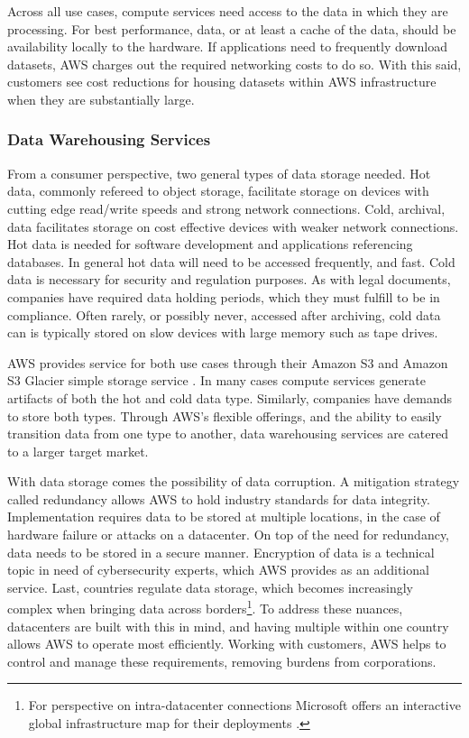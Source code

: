 \documentclass[a4paper, 12pt]{article}
\begin{document}
Across all use cases, compute services need access to the data in which they are processing.
For best performance, data, or at least a cache of the data, should be availability locally to the hardware.
If applications need to frequently download datasets, AWS charges out the required networking costs to do so.
With this said, customers see cost reductions for housing datasets within AWS infrastructure when they are substantially large.

\subsubsection{Data Warehousing Services}
From a consumer perspective, two general types of data storage needed.
Hot data, commonly refereed to object storage, facilitate storage on devices with cutting edge read/write speeds and strong network connections.
Cold, archival, data facilitates storage on cost effective devices with weaker network connections.
Hot data is needed for software development and applications referencing databases.
In general hot data will need to be accessed frequently, and fast.
Cold data is necessary for security and regulation purposes.
As with legal documents, companies have required data holding periods, which they must fulfill to be in compliance.
Often rarely, or possibly never, accessed after archiving, cold data can is typically stored on slow devices with large memory such as tape drives.

AWS provides service for both use cases through their Amazon S3 and Amazon S3 Glacier simple storage service \cite{AMZN_AWS_SIMPLE_STORAGE}.
In many cases compute services generate artifacts of both the hot and cold data type.
Similarly, companies have demands to store both types.
Through AWS's flexible offerings, and the ability to easily transition data from one type to another, data warehousing services are catered to a larger target market.

With data storage comes the possibility of data corruption.
A mitigation strategy called redundancy allows AWS to hold industry standards for data integrity.
Implementation requires data to be stored at multiple locations, in the case of hardware failure or attacks on a datacenter.
On top of the need for redundancy, data needs to be stored in a secure manner.
Encryption of data is a technical topic in need of cybersecurity experts, which AWS provides as an additional service.
Last, countries regulate data storage, which becomes increasingly complex when bringing data across borders\footnote{For perspective on intra-datacenter connections Microsoft offers an interactive global infrastructure map for their deployments \cite{MSFT_AZURE_GLOBAL_INFRA_MAP}.}.
To address these nuances, datacenters are built with this in mind, and having multiple within one country allows AWS to operate most efficiently.
Working with customers, AWS helps to control and manage these requirements, removing burdens from corporations.
\end{document}
